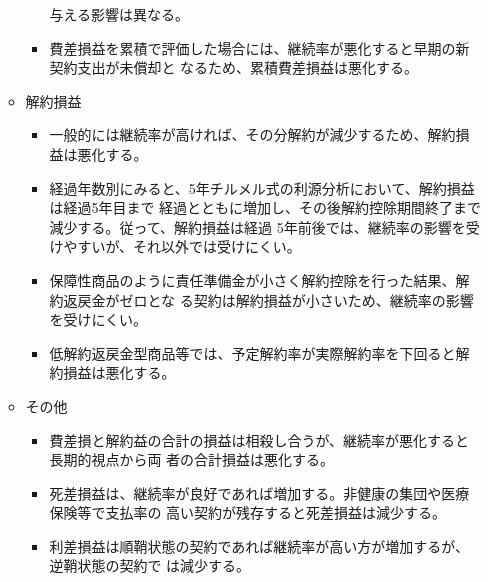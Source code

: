 \documentclass[report,gutter=10mm,fore-edge=10mm,uplatex,dvipdfmx]{jlreq}
\begin{document}
\begin{itemize}
\begin{itemize}
\begin{itemize}
与える影響は異なる。
\item[] 費差損益を累積で評価した場合には、継続率が悪化すると早期の新契約支出が未償却と
なるため、累積費差損益は悪化する。
\end{itemize}
\item[] 解約損益
\begin{itemize}
\item[] 一般的には継続率が高ければ、その分解約が減少するため、解約損益は悪化する。
\item[] 経過年数別にみると、5年チルメル式の利源分析において、解約損益は経過5年目まで
経過とともに増加し、その後解約控除期間終了まで減少する。従って、解約損益は経過
5年前後では、継続率の影響を受けやすいが、それ以外では受けにくい。
\item[] 保障性商品のように責任準備金が小さく解約控除を行った結果、解約返戻金がゼロとな
る契約は解約損益が小さいため、継続率の影響を受けにくい。
\item[] 低解約返戻金型商品等では、予定解約率が実際解約率を下回ると解約損益は悪化する。
\end{itemize}
\item[] その他
\begin{itemize}
\item[] 費差損と解約益の合計の損益は相殺し合うが、継続率が悪化すると長期的視点から両
者の合計損益は悪化する。
\item[] 死差損益は、継続率が良好であれば増加する。非健康の集団や医療保険等で支払率の
高い契約が残存すると死差損益は減少する。
\item[] 利差損益は順鞘状態の契約であれば継続率が高い方が増加するが、逆鞘状態の契約で
は減少する。
\end{itemize}
\end{itemize}
\end{itemize}
\end{document}
